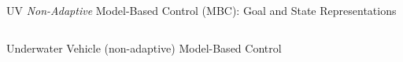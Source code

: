 \begin{frame}{UV {\it Non-Adaptive} Model-Based Control (MBC): Goal and State Representations}
\begin{columns}
  \end{columns} 

\end{frame}



\begin{frame}[t]{Underwater Vehicle (non-adaptive) Model-Based Control}%




\end{frame}
